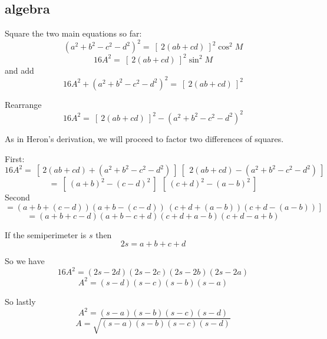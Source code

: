 \documentclass[11pt, oneside]{article}
\begin{document}
\subsection*{algebra}

Square the two main equations so far:
\[ (a^2 + b^2 - c^2 - d^2)^2 =  \ [ \ 2(ab + cd) \ ]^2 \cos^2 M \]
\[ 16A^2 =  \ [ \ 2(ab + cd) \ ]^2 \sin^2 M \]
and add
\[ 16A^2 + (a^2 + b^2 - c^2 - d^2)^2 =   \ [ \ 2(ab + cd) \ ]^2 \]

Rearrange
\[ 16A^2 =   \ [ \ 2(ab + cd) \ ]^2 - (a^2 + b^2 - c^2 - d^2)^2 \]

As in Heron's derivation, we will proceed to factor two differences of squares.  

First:
\[ 16A^2 =   \ [ \ 2(ab + cd) + (a^2 + b^2 - c^2 - d^2) \ ] \ [ \ \ 2(ab + cd) - (a^2 + b^2 - c^2 - d^2) \ ] \]
\[ = \ [ \ (a + b)^2 - (c - d)^2 \ ] \  \ [ \ (c + d)^2 - (a - b)^2 \ ] \]
Second
\[ = (a + b + (c - d))(a + b - (c - d)) \ (c + d + (a - b))(c + d - (a - b)) \ ] \]
\[ = (a + b + c - d)(a + b - c + d)(c + d + a - b)(c + d - a + b) \]

If the semiperimeter is $s$ then
\[ 2s = a + b + c + d \]

So we have
\[ 16A^2 = (2s - 2d)(2s - 2c)(2s - 2b)(2s - 2a) \]
\[ A^2 = (s - d)(s - c)(s - b)(s - a) \]

So lastly
\[ A^2 = (s - a)(s - b)(s - c)(s - d) \]
\[ A = \sqrt{(s - a)(s - b)(s - c)(s - d)} \]
\end{document}
